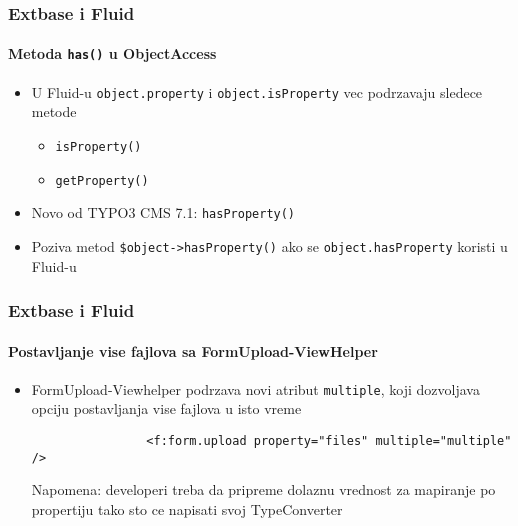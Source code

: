 \begin{frame}[fragile]
	\frametitle{Extbase i Fluid}
	\framesubtitle{Metoda \texttt{has()} u ObjectAccess}

	\begin{itemize}

		\item U Fluid-u \texttt{object.property} i \texttt{object.isProperty} vec podrzavaju sledece metode

			\begin{itemize}
				\item \texttt{isProperty()}
				\item \texttt{getProperty()}
			\end{itemize}

		\item Novo od TYPO3 CMS 7.1: \texttt{hasProperty()}
		\item Poziva metod \texttt{\$object->hasProperty()}\newline
			ako se \texttt{object.hasProperty} koristi u Fluid-u

	\end{itemize}

\end{frame}


\begin{frame}[fragile]
	\frametitle{Extbase i Fluid}
	\framesubtitle{Postavljanje vise fajlova sa FormUpload-ViewHelper}

	\begin{itemize}

		\item FormUpload-Viewhelper podrzava novi atribut \texttt{multiple}, koji dozvoljava opciju postavljanja vise fajlova u isto vreme

			\begin{lstlisting}
				<f:form.upload property="files" multiple="multiple" />
			\end{lstlisting}

			\vspace{0.2cm}

			\begingroup
				\color{red}
					Napomena: developeri treba da pripreme dolaznu vrednost za mapiranje po propertiju tako sto ce napisati svoj TypeConverter
			\endgroup

	\end{itemize}

\end{frame}

